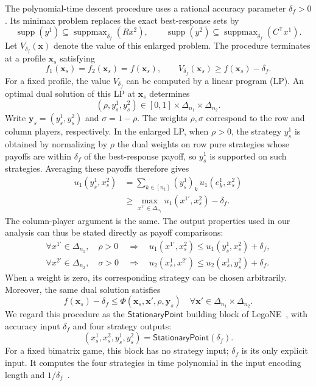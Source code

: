 \documentclass[11pt]{article}
\theoremstyle{remark}
\theoremstyle{plain}
\newcommand{\spoint}{\mathsf{StationaryPoint}}
\DeclareMathOperator{\supp}{supp}
\DeclareMathOperator{\suppmax}{suppmax}
\begin{document}
The polynomial-time descent procedure uses a rational accuracy
parameter $\delta_f>0$. Its minimax problem replaces the exact
best-response sets by
\[
 \supp(y^1)\subseteq\suppmax_{\delta_f}(Rx^2),
 \qquad
 \supp(y^2)\subseteq\suppmax_{\delta_f}(C^{\mathsf T}x^1).
\]
Let $V_{\delta_f}(\boldsymbol{x})$ denote the value of this enlarged
problem. The procedure terminates at a profile
$\boldsymbol{x}_s$ satisfying
\begin{equation}
 f_1(\boldsymbol{x}_s)=f_2(\boldsymbol{x}_s)=f(\boldsymbol{x}_s),
 \qquad V_{\delta_f}(\boldsymbol{x}_s)\ge f(\boldsymbol{x}_s)-\delta_f.
 \label{eq:stationary-termination}
\end{equation}
For a fixed profile, the value $V_{\delta_f}$ can be computed by a
linear program (LP).
An optimal dual solution of this LP at $\boldsymbol{x}_s$ determines
\[
 (\rho,y_s^1,y_s^2)\in[0,1]\times\Delta_{n_1}\times\Delta_{n_2}.
\]
Write $\boldsymbol{y}_s=(y_s^1,y_s^2)$ and $\sigma=1-\rho$.
The weights $\rho,\sigma$ correspond to the row and column players,
respectively. In the enlarged LP, when $\rho>0$, the strategy $y_s^1$
is obtained by normalizing by $\rho$ the dual weights on row pure
strategies whose payoffs are within $\delta_f$ of the best-response
payoff, so $y_s^1$ is supported on such strategies. Averaging these
payoffs therefore gives
\[
 \begin{aligned}
  u_1(y_s^1,x_s^2)
   &=\sum_{k\in[n_1]}(y_s^1)_k\,u_1(e_k^1,x_s^2)\\
   &\ge\max_{x^{1\prime}\in\Delta_{n_1}}u_1(x^{1\prime},x_s^2)-\delta_f.
 \end{aligned}
\]
The column-player argument is the same. The output properties used
in our analysis can thus be stated directly as payoff comparisons:
\begin{equation}
 \begin{aligned}
  \forall x^{1\prime}\in\Delta_{n_1},\quad
  \rho>0&\ \Longrightarrow\quad
  u_1(x^{1\prime},x_s^2)\le u_1(y_s^1,x_s^2)+\delta_f,\\
  \forall x^{2\prime}\in\Delta_{n_2},\quad
  \sigma>0&\ \Longrightarrow\quad
  u_2(x_s^1,x^{2\prime})\le u_2(x_s^1,y_s^2)+\delta_f.
 \end{aligned}
 \label{eq:ts-best-response}
\end{equation}
When a weight is zero, its corresponding strategy can be chosen
arbitrarily. Moreover, the same dual solution satisfies
\begin{equation}
 f(\boldsymbol{x}_s)-\delta_f\le
 \Phi(\boldsymbol{x}_s,\boldsymbol{x}',\rho,\boldsymbol{y}_s)
 \quad\forall\boldsymbol{x}'\in\Delta_{n_1}\times\Delta_{n_2}.
 \label{eq:stationary}
\end{equation}
We regard this procedure as the $\spoint$ building block of
LegoNE~\cite{legone2026}, with accuracy input $\delta_f$ and four
strategy outputs:
\[
 (x_s^1,x_s^2,y_s^1,y_s^2)=\spoint(\delta_f).
\]
For a fixed bimatrix game, this block has no strategy input;
$\delta_f$ is its only explicit input. It computes the four
strategies in time polynomial in the input encoding
length and $1/\delta_f$~\cite{ts2008,dfm2023}.
\end{document}
